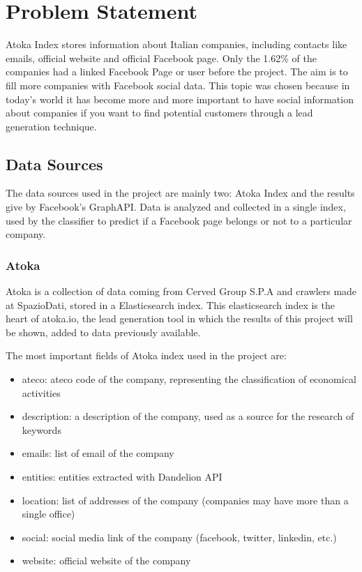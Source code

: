 \chapter{Problem Statement}
Atoka Index stores information about Italian companies, including contacts like emails, official website and official Facebook page. Only the 1.62\% of the companies had a linked Facebook Page or user before the project. The aim is to fill more companies with Facebook social data. This topic was chosen because in today's world it has become more and more important to have social information about companies if you want to find potential customers through a lead generation technique.

\section{Data Sources}
The data sources used in the project are mainly two: Atoka Index and the results give by Facebook's GraphAPI. Data is analyzed and collected in a single index, used by the classifier to predict if a Facebook page belongs or not to a particular company.

\subsection{Atoka}
Atoka is a collection of data coming from Cerved Group S.P.A and crawlers made at SpazioDati, stored in a Elasticsearch index. This elasticsearch index is the heart of atoka.io, the lead generation tool in which the results of this project will be shown, added to data previously available.

The most important fields of Atoka index used in the project are:
\begin{itemize}
    \item ateco: ateco code of the company, representing the classification of economical activities
    \item description: a description of the company, used as a source for the research of keywords
    \item emails: list of email of the company
    \item entities: entities extracted with Dandelion API%
    \item location: list of addresses of the company (companies may have more than a single office)
    \item social: social media link of the company (facebook, twitter, linkedin, etc.)
    \item website: official website of the company
\end{itemize}

